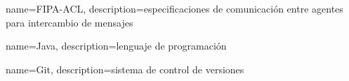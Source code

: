 {
    name=FIPA-ACL,
    description={especificaciones de comunicación entre agentes para intercambio de mensajes}
}

{
    name=Java,
    description={lenguaje de programación}
}

{
    name=Git,
    description={sistema de control de versiones}
}

